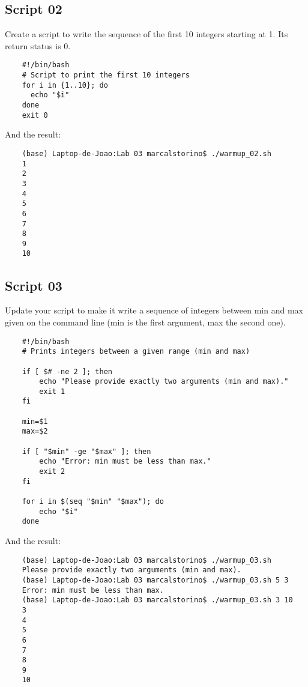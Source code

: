 \documentclass[a4paper, 12pt]{article}
\begin{document}
\subsection{Script 02}
Create a script to write the sequence of the first 10 integers starting at 1. Its return status is 0.

\begin{lstlisting}
    #!/bin/bash
    # Script to print the first 10 integers
    for i in {1..10}; do
      echo "$i"
    done
    exit 0
\end{lstlisting}

And the result:

\begin{lstlisting}
    (base) Laptop-de-Joao:Lab 03 marcalstorino$ ./warmup_02.sh
    1
    2
    3
    4
    5
    6
    7
    8
    9
    10
\end{lstlisting}

\subsection{Script 03}
Update your script to make it write a sequence of integers between min and max given on the command line (min is the first argument, max the second one).

\begin{lstlisting}
    #!/bin/bash
    # Prints integers between a given range (min and max)
    
    if [ $# -ne 2 ]; then
        echo "Please provide exactly two arguments (min and max)."
        exit 1
    fi
    
    min=$1
    max=$2
    
    if [ "$min" -ge "$max" ]; then
        echo "Error: min must be less than max."
        exit 2
    fi
    
    for i in $(seq "$min" "$max"); do
        echo "$i"
    done
\end{lstlisting}

And the result:

\begin{lstlisting}
    (base) Laptop-de-Joao:Lab 03 marcalstorino$ ./warmup_03.sh
    Please provide exactly two arguments (min and max).
    (base) Laptop-de-Joao:Lab 03 marcalstorino$ ./warmup_03.sh 5 3
    Error: min must be less than max.
    (base) Laptop-de-Joao:Lab 03 marcalstorino$ ./warmup_03.sh 3 10
    3
    4
    5
    6
    7
    8
    9
    10
\end{lstlisting}
\end{document}
